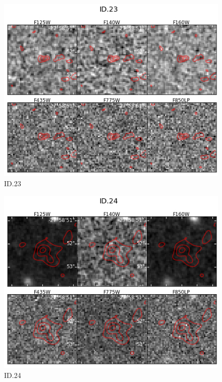 \begin{figure}[tbp]
\centering \includegraphics[width=160mm]{Matched/ASPECS_Cutout_22.jpg}
\caption{ID.23}
\label{fig:Match_Three}
\end{figure}

\begin{figure}[tbp]
\centering \includegraphics[width=160mm]{Matched/ASPECS_Cutout_23.jpg}
\caption{ID.24}
\label{fig:Match_Three}
\end{figure}

